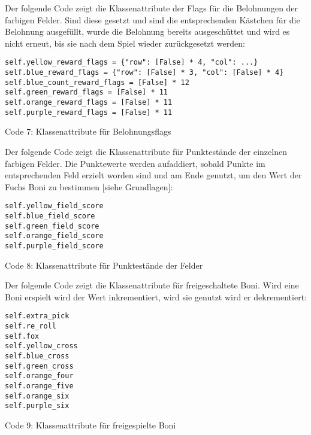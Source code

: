 \begin{minipage}{\linewidth}
Der folgende Code zeigt die Klassenattribute der Flags für die Belohnungen der farbigen Felder. Sind diese gesetzt und sind die entsprechenden Kästchen für die Belohnung ausgefüllt, wurde die Belohnung bereits ausgeschüttet und wird es nicht erneut, bis sie nach dem Spiel wieder zurückgesetzt werden:
\vspace{0.5cm}
\begin{lstlisting}
self.yellow_reward_flags = {"row": [False] * 4, "col": ...}
self.blue_reward_flags = {"row": [False] * 3, "col": [False] * 4}
self.blue_count_reward_flags = [False] * 12
self.green_reward_flags = [False] * 11
self.orange_reward_flags = [False] * 11
self.purple_reward_flags = [False] * 11
\end{lstlisting}
Code 7: Klassenattribute für Belohnungsflags\\
\end{minipage}

\begin{minipage}{\linewidth}
Der folgende Code zeigt die Klassenattribute für Punktestände der einzelnen farbigen Felder. Die Punktewerte werden aufaddiert, sobald Punkte im entsprechenden Feld erzielt worden sind und am Ende genutzt, um den Wert der Fuchs Boni zu bestimmen [siehe Grundlagen]:
\vspace{0.5cm}
\begin{lstlisting}
self.yellow_field_score
self.blue_field_score
self.green_field_score
self.orange_field_score
self.purple_field_score
\end{lstlisting}
Code 8: Klassenattribute für Punktestände der Felder\\
\end{minipage}

\begin{minipage}{\linewidth}
Der folgende Code zeigt die Klassenattribute für freigeschaltete Boni. Wird eine Boni erspielt wird der Wert inkrementiert, wird sie genutzt wird er dekrementiert:
\vspace{0.5cm}
\begin{lstlisting}
self.extra_pick
self.re_roll
self.fox
self.yellow_cross
self.blue_cross
self.green_cross
self.orange_four
self.orange_five
self.orange_six
self.purple_six
\end{lstlisting}
Code 9: Klassenattribute für freigespielte Boni\\
\end{minipage}

